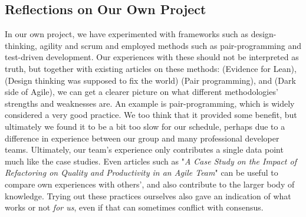 \subsection{Reflections on Our Own Project}

In our own project, we have experimented with frameworks such as design-thinking, agility and scrum
and employed methods such as pair-programming and test-driven development.
Our experiences with these should not be interpreted as truth, but together with
existing articles on these methods: (Evidence for Lean)\cite{Evidence_for_Lean}, (Design thinking was supposed to fix the world)\cite{fix_the_world} \cite{Effectiveness_of_Pair_Programming} (Pair programming),
and (Dark side of Agile)\cite{DarkSide}, we can get a clearer picture on what different methodologies' strengths and weaknesses are.
An example is pair-programming, which is widely considered a very good practice.
We too think that it provided some benefit, but ultimately we found it to be a bit too slow for our schedule,
perhaps due to a difference in experience between our group and many professional developer teams.
Ultimately, our team's experience only contributes a single data point much like the case studies.
Even articles such as "\textit{A Case Study on the Impact of Refactoring on
Quality and Productivity in an Agile Team}"\cite{Impact_of_Refactoring} can be useful to compare
own experiences with others', and also contribute to the larger body of knowledge.
Trying out these practices ourselves also gave an indication of what works or not \textit{for us},
even if that can sometimes conflict with consensus.
